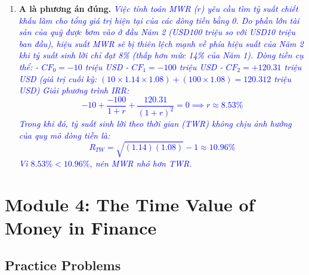 \begin{enumerate}
	\item \textbf{A là phương án đúng.} \textcolor{blue}{\textit{Việc tính toán MWR ($r$) yêu cầu tìm tỷ suất chiết khấu làm cho tổng giá trị hiện tại của các dòng tiền bằng 0. Do phần lớn tài sản của quỹ được bơm vào ở đầu Năm 2 (USD100 triệu so với USD10 triệu ban đầu), hiệu suất MWR sẽ bị thiên lệch mạnh về phía hiệu suất của Năm 2 khi tỷ suất sinh lời chỉ đạt 8\% (thấp hơn mức 14\% của Năm 1).
	      Dòng tiền cụ thể:
	      - $CF_0 = -10$ triệu USD
	      - $CF_1 = -100$ triệu USD
	      - $CF_2 = +120.31$ triệu USD (giá trị cuối kỳ: $(10 \times 1.14 \times 1.08) + (100 \times 1.08) = 120.312$ triệu USD)
	      Giải phương trình IRR:
	      \[
	      -10 + \frac{-100}{1+r} + \frac{120.31}{(1+r)^2} = 0 \implies r \approx 8.53\%
	      \]
	      Trong khi đó, tỷ suất sinh lời theo thời gian (TWR) không chịu ảnh hưởng của quy mô dòng tiền là:
	      \[
	      R_{TW} = \sqrt{(1.14)(1.08)} - 1 \approx 10.96\%
	      \]
	      Vì $8.53\% < 10.96\%$, nên MWR nhỏ hơn TWR.}}
\end{enumerate}

\newpage

\section{Module 4: The Time Value of Money in Finance}
\label{sec:app_Problems_M4}

\subsection{Practice Problems}
\label{subsec:app_Problems_M4}

